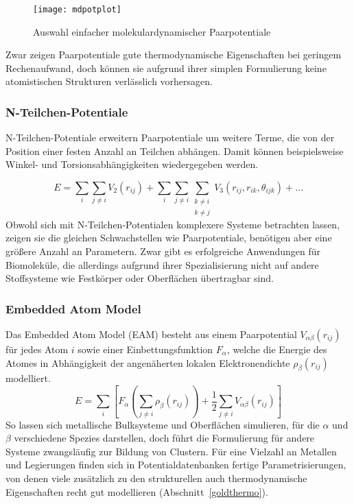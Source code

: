 \begin{figure}
  \centering
  \texttt{[image: mdpotplot]}
  \caption{Auswahl einfacher molekulardynamischer Paarpotentiale}
  \label{fig:mdpairpotentials}
\end{figure}

Zwar zeigen Paarpotentiale gute thermodynamische Eigenschaften bei geringem Rechenaufwand, doch können sie aufgrund ihrer simplen Formulierung keine atomistischen Strukturen verlässlich vorhersagen.

\subsubsection{N-Teilchen-Potentiale}

N-Teilchen-Potentiale erweitern Paarpotentiale um weitere Terme, die von der Position einer festen Anzahl an Teilchen abhängen.
Damit können beispielsweise Winkel- und Torsionsabhängigkeiten wiedergegeben werden.

\begin{equation}
  E = \sum_i\sum_{j \neq i}{V_2\left(r_{ij}\right)} + \sum_i\sum_{j \neq i}\sum_{\substack{k \neq i \\ k \neq j}}{V_3\left(r_{ij}, r_{ik}, \theta_{ijk}\right)} + \dots
\end{equation}
Obwohl sich mit N-Teilchen-Potentialen komplexere Systeme betrachten lassen, zeigen sie die gleichen Schwachstellen wie Paarpotentiale, benötigen aber eine größere Anzahl an Parametern.
Zwar gibt es erfolgreiche Anwendungen für Biomoleküle\cite{case_amber_2005,brooks_charmm:_1983,brooks_charmm:_2009,berendsen_gromacs:_1995,hess_gromacs_2008}, die allerdings aufgrund ihrer Spezialisierung nicht auf andere Stoffsysteme wie Festkörper oder Oberflächen übertragbar sind.

\subsubsection{Embedded Atom Model}

Das Embedded Atom Model (EAM) besteht aus einem Paarpotential $V_{\alpha\beta}(r_{ij})$ für jedes Atom $i$ sowie einer Einbettungsfunktion $F_\alpha$, welche die Energie des Atomes in Abhängigkeit der angenäherten lokalen Elektronendichte $\rho_\beta(r_{ij})$ modelliert\cite{daw_embedded-atom_1984}.
\begin{equation}
  E = \sum_i\left[F_\alpha\left(\sum_{j\neq i}{\rho_\beta\left(r_{ij}\right)}\right) + \frac{1}{2}\sum_{j\neq i}{V_{\alpha\beta}\left(r_{ij}\right)}\right]
\end{equation}
So lassen sich metallische Bulksysteme und Oberflächen simulieren, für die $\alpha$ und $\beta$ verschiedene Spezies darstellen, doch führt die Formulierung für andere Systeme zwangsläufig zur Bildung von Clustern.
Für eine Vielzahl an Metallen und Legierungen finden sich in Potentialdatenbanken fertige Parametrisierungen\cite{becker_interatomic_2014}, von denen viele zusätzlich zu den strukturellen auch thermodynamische Eigenschaften recht gut modellieren (Abschnitt~\ref{goldthermo}).

